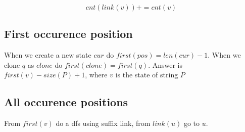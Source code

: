         $$cnt(link(v)) += cnt(v)$$

\subsection{First occurence position}
        When we create a new state $cur$ do $first(pos) = len(cur) - 1$.
        When we clone $q$ as $clone$ do $first(clone) = first(q)$.
        Answer is $first(v) - size(P) + 1$, where $v$ is the state of string $P$

\subsection{All occurence positions}
        From $first(v)$ do a dfs using suffix link, from $link(u)$ go to $u$.
